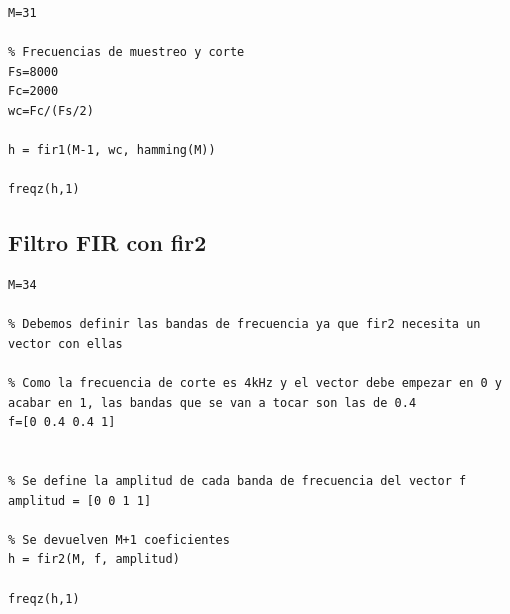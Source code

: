 \documentclass[11pt,a4paper]{article}
\begin{document}
\begin{lstlisting}[frame=single]
% Coeficientes del filtro
M=31

% Frecuencias de muestreo y corte
Fs=8000
Fc=2000
wc=Fc/(Fs/2)

h = fir1(M-1, wc, hamming(M))

freqz(h,1)
\end{lstlisting}

\subsection{Filtro FIR con fir2}
\label{code8}

\begin{lstlisting}[frame=single]
% Coeficientes del filtro
M=34

% Debemos definir las bandas de frecuencia ya que fir2 necesita un vector con ellas

% Como la frecuencia de corte es 4kHz y el vector debe empezar en 0 y acabar en 1, las bandas que se van a tocar son las de 0.4
f=[0 0.4 0.4 1]


% Se define la amplitud de cada banda de frecuencia del vector f
amplitud = [0 0 1 1]

% Se devuelven M+1 coeficientes
h = fir2(M, f, amplitud)

freqz(h,1)

\end{lstlisting}
\end{document}
